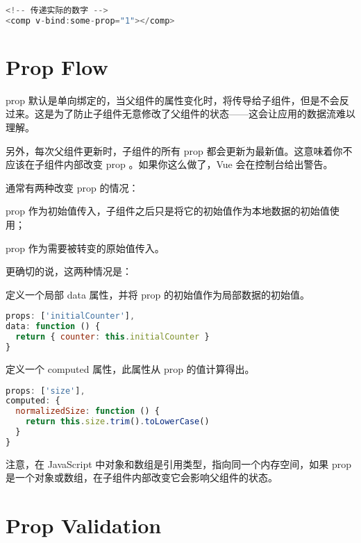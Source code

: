 \begin{lstlisting}[language=JavaScript]
<!-- 传递实际的数字 -->
<comp v-bind:some-prop="1"></comp>
\end{lstlisting}


\section{Prop Flow}




prop 默认是单向绑定的，当父组件的属性变化时，将传导给子组件，但是不会反过来。这是为了防止子组件无意修改了父组件的状态——这会让应用的数据流难以理解。

另外，每次父组件更新时，子组件的所有 prop 都会更新为最新值。这意味着你不应该在子组件内部改变 prop 。如果你这么做了，Vue 会在控制台给出警告。

通常有两种改变 prop 的情况：

\begin{compactenum}
\item prop 作为初始值传入，子组件之后只是将它的初始值作为本地数据的初始值使用；
\item prop 作为需要被转变的原始值传入。
\end{compactenum}

更确切的说，这两种情况是：

\begin{compactenum}
\item 定义一个局部 data 属性，并将 prop 的初始值作为局部数据的初始值。

\begin{lstlisting}[language=JavaScript]
props: ['initialCounter'],
data: function () {
  return { counter: this.initialCounter }
}
\end{lstlisting}

\item 定义一个 computed 属性，此属性从 prop 的值计算得出。

\begin{lstlisting}[language=JavaScript]
props: ['size'],
computed: {
  normalizedSize: function () {
    return this.size.trim().toLowerCase()
  }
}
\end{lstlisting}


\end{compactenum}

注意，在 JavaScript 中对象和数组是引用类型，指向同一个内存空间，如果 prop 是一个对象或数组，在子组件内部改变它会影响父组件的状态。

\section{Prop Validation}

